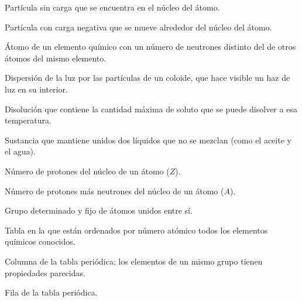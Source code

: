 \begin{vocabulary}
    Partícula sin carga que se encuentra en el núcleo del átomo.
\end{vocabulary}

\begin{vocabulary}
    Partícula con carga negativa que se mueve alrededor del núcleo del átomo.
\end{vocabulary}

\begin{vocabulary}
    Átomo de un elemento químico con un número de neutrones distinto del de otros átomos del mismo elemento.
\end{vocabulary}

\begin{vocabulary}
    Dispersión de la luz por las partículas de un coloide, que hace visible un haz de luz en su interior.
\end{vocabulary}

\begin{vocabulary}
    Disolución que contiene la cantidad máxima de soluto que se puede disolver a esa temperatura.
\end{vocabulary}

\begin{vocabulary}
    Sustancia que mantiene unidos dos líquidos que no se mezclan (como el aceite y el agua).
\end{vocabulary}

\begin{vocabulary}
    Número de protones del núcleo de un átomo (\(Z\)).
\end{vocabulary}

\begin{vocabulary}
    Número de protones más neutrones del núcleo de un átomo (\(A\)).
\end{vocabulary}

\begin{vocabulary}
    Grupo determinado y fijo de átomos unidos entre sí.
\end{vocabulary}

\begin{vocabulary}
    Tabla en la que están ordenados por número atómico todos los elementos químicos conocidos.
\end{vocabulary}

\begin{vocabulary}
    Columna de la tabla periódica; los elementos de un mismo grupo tienen propiedades parecidas.
\end{vocabulary}

\begin{vocabulary}
    Fila de la tabla periódica.
\end{vocabulary}
